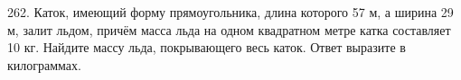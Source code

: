 262. Каток, имеющий форму прямоугольника, длина которого 57 м, а ширина 29 м, залит льдом, причём масса льда на одном квадратном метре катка составляет 10 кг. Найдите массу льда, покрывающего весь каток. Ответ выразите в килограммах.\\
